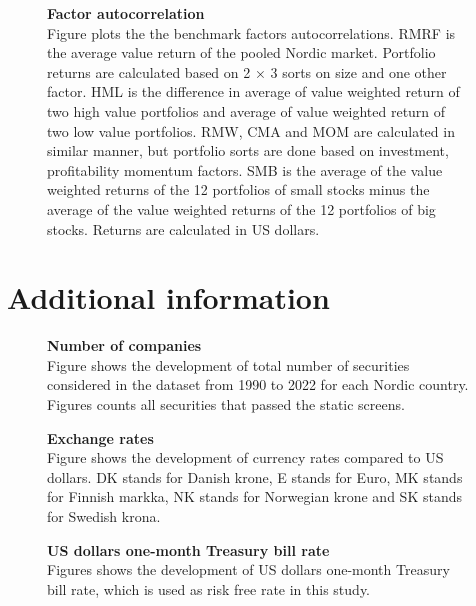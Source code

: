 \documentclass{article}
\begin{document}
\begin{figure}[ht]
\centering
\caption[Factor autocorrelation]{\textbf{Factor autocorrelation}\\ Figure plots the the benchmark factors autocorrelations. RMRF is the average value return of the pooled Nordic market. Portfolio returns are calculated based on 2 × 3 sorts on size and one other factor. HML is the difference in average of value weighted return of two high value portfolios and average of value weighted return of two low value portfolios. RMW, CMA and MOM are calculated in similar manner, but portfolio sorts are done based on investment, profitability momentum factors. SMB is the average of the value weighted returns of the 12 portfolios of small stocks minus the average of the value weighted returns of the 12 portfolios of big stocks. Returns are calculated in US dollars.}

\label{plot:factor_autocorrelation}
\end{figure}

\clearpage

\section{Additional information}
\renewcommand{\thefigure}{C.\arabic{figure}}
\setcounter{figure}{0}
\renewcommand{\thetable}{C.\arabic{table}}
\setcounter{table}{0}

\begin{figure}[ht]
\centering
\caption[Number of companies]{\textbf{Number of companies}\\ Figure shows the development of total number of securities considered in the dataset from 1990 to 2022 for each Nordic country. Figures counts all securities that passed the static screens.}

\label{plot:number_of_companies}
\end{figure}

\begin{figure}[ht]
\centering
\caption[Exchange rates]{\textbf{Exchange rates}\\ Figure shows the development of currency rates compared to US dollars. DK stands for  Danish krone, E stands for Euro, MK stands for Finnish markka, NK stands for Norwegian krone and SK stands for Swedish krona.}

\label{plot:fx_rates}
\end{figure}

\begin{figure}[ht]
\centering
\caption[US dollar one-month Treasury bill rate]{\textbf{US dollars one-month Treasury bill rate}\\ Figures shows the development of US dollars one-month Treasury bill rate, which is used as risk free rate in this study.}

\label{plot:rf_ts}
\end{figure}
\end{document}
